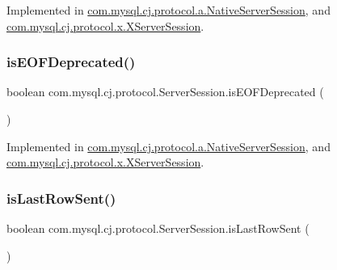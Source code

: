 Implemented in \mbox{\hyperlink{classcom_1_1mysql_1_1cj_1_1protocol_1_1a_1_1_native_server_session_a0c02c1e5f4fb1fd4c03c6ec956e48cff}{com.\+mysql.\+cj.\+protocol.\+a.\+Native\+Server\+Session}}, and \mbox{\hyperlink{classcom_1_1mysql_1_1cj_1_1protocol_1_1x_1_1_x_server_session_a4c63d47230de3aeed388eb17bb4b6398}{com.\+mysql.\+cj.\+protocol.\+x.\+X\+Server\+Session}}.

\mbox{\label{interfacecom_1_1mysql_1_1cj_1_1protocol_1_1_server_session_ac41728a86890f318604684f6d8e36635}} 
\subsubsection{\texorpdfstring{is\+E\+O\+F\+Deprecated()}{isEOFDeprecated()}}
{\footnotesize\ttfamily boolean com.\+mysql.\+cj.\+protocol.\+Server\+Session.\+is\+E\+O\+F\+Deprecated (\begin{DoxyParamCaption}{ }\end{DoxyParamCaption})}



Implemented in \mbox{\hyperlink{classcom_1_1mysql_1_1cj_1_1protocol_1_1a_1_1_native_server_session_adeaa0a01acf79d5b609ce8757822948d}{com.\+mysql.\+cj.\+protocol.\+a.\+Native\+Server\+Session}}, and \mbox{\hyperlink{classcom_1_1mysql_1_1cj_1_1protocol_1_1x_1_1_x_server_session_af0ec0b234345774f557d2cf718df418e}{com.\+mysql.\+cj.\+protocol.\+x.\+X\+Server\+Session}}.

\mbox{\label{interfacecom_1_1mysql_1_1cj_1_1protocol_1_1_server_session_a0c2296276bee98622e9bb340f9c7cb59}} 
\subsubsection{\texorpdfstring{is\+Last\+Row\+Sent()}{isLastRowSent()}}
{\footnotesize\ttfamily boolean com.\+mysql.\+cj.\+protocol.\+Server\+Session.\+is\+Last\+Row\+Sent (\begin{DoxyParamCaption}{ }\end{DoxyParamCaption})}



